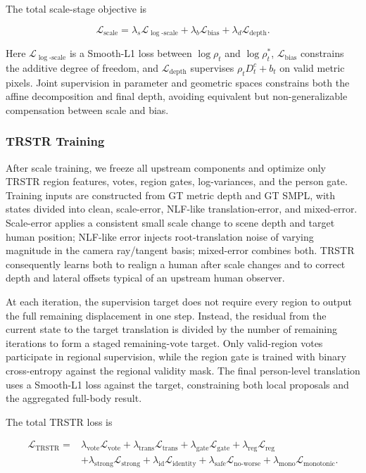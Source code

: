 \documentclass{article}
\begin{document}
The total scale-stage objective is

\begin{equation}
\mathcal{L}_{\mathrm{scale}}
=\lambda_s\mathcal{L}_{\log\text{-}\mathrm{scale}}
+\lambda_b\mathcal{L}_{\mathrm{bias}}
+\lambda_d\mathcal{L}_{\mathrm{depth}}.
\label{eq:scale-loss}
\end{equation}

Here $\mathcal{L}_{\log\text{-}\mathrm{scale}}$ is a Smooth-L1 loss between $\log\rho_t$ and $\log\rho_t^*$, $\mathcal{L}_{\mathrm{bias}}$ constrains the additive degree of freedom, and $\mathcal{L}_{\mathrm{depth}}$ supervises $\rho_tD_t^c+b_t$ on valid metric pixels. Joint supervision in parameter and geometric spaces constrains both the affine decomposition and final depth, avoiding equivalent but non-generalizable compensation between scale and bias.

\subsubsection{TRSTR Training}

After scale training, we freeze all upstream components and optimize only TRSTR region features, votes, region gates, log-variances, and the person gate. Training inputs are constructed from GT metric depth and GT SMPL, with states divided into clean, scale-error, NLF-like translation-error, and mixed-error. Scale-error applies a consistent small scale change to scene depth and target human position; NLF-like error injects root-translation noise of varying magnitude in the camera ray/tangent basis; mixed-error combines both. TRSTR consequently learns both to realign a human after scale changes and to correct depth and lateral offsets typical of an upstream human observer.

At each iteration, the supervision target does not require every region to output the full remaining displacement in one step. Instead, the residual from the current state to the target translation is divided by the number of remaining iterations to form a staged remaining-vote target. Only valid-region votes participate in regional supervision, while the region gate is trained with binary cross-entropy against the regional validity mask. The final person-level translation uses a Smooth-L1 loss against the target, constraining both local proposals and the aggregated full-body result.

The total TRSTR loss is

\begin{equation}
\begin{aligned}
\mathcal{L}_{\mathrm{TRSTR}}={}&
\lambda_{\mathrm{vote}}\mathcal{L}_{\mathrm{vote}}
+\lambda_{\mathrm{trans}}\mathcal{L}_{\mathrm{trans}}
+\lambda_{\mathrm{gate}}\mathcal{L}_{\mathrm{gate}}
+\lambda_{\mathrm{reg}}\mathcal{L}_{\mathrm{reg}}\\
&+\lambda_{\mathrm{strong}}\mathcal{L}_{\mathrm{strong}}
+\lambda_{\mathrm{id}}\mathcal{L}_{\mathrm{identity}}
+\lambda_{\mathrm{safe}}\mathcal{L}_{\mathrm{no\text{-}worse}}
+\lambda_{\mathrm{mono}}\mathcal{L}_{\mathrm{monotonic}}.
\end{aligned}
\label{eq:trstr-loss}
\end{equation}
\end{document}
